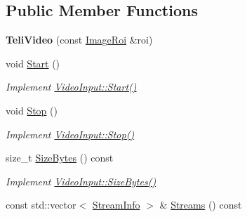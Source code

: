 \subsection*{Public Member Functions}
\begin{DoxyCompactItemize}
\item 
{\bfseries Teli\+Video} (const \hyperlink{structpangolin_1_1_image_roi}{Image\+Roi} \&roi)\hypertarget{classpangolin_1_1_teli_video_a597ca7e6de3d47181e1489709ccdf241}{}\label{classpangolin_1_1_teli_video_a597ca7e6de3d47181e1489709ccdf241}

\item 
void \hyperlink{classpangolin_1_1_teli_video_a9a4993c830eb6e03c45f1959860f0fbf}{Start} ()\hypertarget{classpangolin_1_1_teli_video_a9a4993c830eb6e03c45f1959860f0fbf}{}\label{classpangolin_1_1_teli_video_a9a4993c830eb6e03c45f1959860f0fbf}

\begin{DoxyCompactList}\small\item\em Implement \hyperlink{structpangolin_1_1_video_input_a74a2e3e1b87c7cbf9de9bcb39e1df128}{Video\+Input\+::\+Start()} \end{DoxyCompactList}\item 
void \hyperlink{classpangolin_1_1_teli_video_a16d504baeb4fd27205841e6dc00a53ea}{Stop} ()\hypertarget{classpangolin_1_1_teli_video_a16d504baeb4fd27205841e6dc00a53ea}{}\label{classpangolin_1_1_teli_video_a16d504baeb4fd27205841e6dc00a53ea}

\begin{DoxyCompactList}\small\item\em Implement \hyperlink{structpangolin_1_1_video_input_a8945f80194cc7ec9594db7f27e7d09b8}{Video\+Input\+::\+Stop()} \end{DoxyCompactList}\item 
size\+\_\+t \hyperlink{classpangolin_1_1_teli_video_a016bd1b34e8943313484e28dd82c0ef7}{Size\+Bytes} () const \hypertarget{classpangolin_1_1_teli_video_a016bd1b34e8943313484e28dd82c0ef7}{}\label{classpangolin_1_1_teli_video_a016bd1b34e8943313484e28dd82c0ef7}

\begin{DoxyCompactList}\small\item\em Implement \hyperlink{structpangolin_1_1_video_input_a93cee5c33386973a2a51165e6bdcf40b}{Video\+Input\+::\+Size\+Bytes()} \end{DoxyCompactList}\item 
const std\+::vector$<$ \hyperlink{classpangolin_1_1_stream_info}{Stream\+Info} $>$ \& \hyperlink{classpangolin_1_1_teli_video_a7faa61d4470f1c4565e39e490a7f96b7}{Streams} () const \hypertarget{classpangolin_1_1_teli_video_a7faa61d4470f1c4565e39e490a7f96b7}{}\label{classpangolin_1_1_teli_video_a7faa61d4470f1c4565e39e490a7f96b7}


\end{DoxyCompactItemize}
